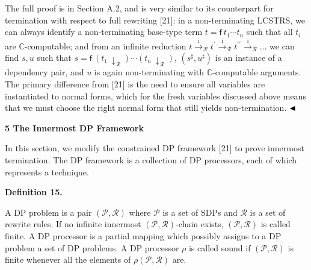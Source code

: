 The full proof is in Section A.2, and is very similar to its counterpart for termination with respect to full rewriting [21]: in a non-terminating LCSTRS, we can always identify a non-terminating base-type term $t={\mathsf{f}}\ {{t}_{1}\cdots{t}_{n}}$ such that all $t_{i}$ are $\mathbb{C}$-computable; and from an infinite reduction $t\xrightarrow{\scriptscriptstyle\mathrm{i}}_{\mathcal{R}}t^{\prime}\xrightarrow{\scriptscriptstyle\mathrm{i}}_{\mathcal{R}}t^{\prime\prime}\xrightarrow{\scriptscriptstyle\mathrm{i}}_{\mathcal{R}}\dots$ we can find $s,u$ such that $s={\mathsf{f}}\ {(t_{1}\,{\downarrow}_{\mathcal{R}})\cdots(t_{n}\,{\downarrow}_{\mathcal{R}})}$, $(s^{\sharp},u^{\sharp})$ is an instance of a dependency pair, and $u$ is again non-terminating with $\mathbb{C}$-computable arguments. The primary difference from [21] is the need to ensure all variables are instantiated to normal forms, which for the fresh variables discussed above means that we must choose the right normal form that still yields non-termination. $\hfill\blacktriangleleft$\par
 
 
 


 
\par\medskip\noindent\textbf{5 The Innermost DP Framework}\par
 
 
In this section, we modify the constrained DP framework [21] to prove innermost termination. The DP framework is a collection of DP processors, each of which represents a technique.\par
 
 
 
\par\medskip\noindent\textbf{Definition 15.}\par
 
 
A DP problem is a pair $(\mathcal{P},\mathcal{R})$ where $\mathcal{P}$ is a set of SDPs and $\mathcal{R}$ is a set of rewrite rules. If no infinite innermost $(\mathcal{P},\mathcal{R})$-chain exists, $(\mathcal{P},\mathcal{R})$ is called finite. A DP processor is a partial mapping which possibly assigns to a DP problem a set of DP problems. A DP processor $\rho$ is called sound if $(\mathcal{P},\mathcal{R})$ is finite whenever all the elements of $\rho(\mathcal{P},\mathcal{R})$ are.\par
 
